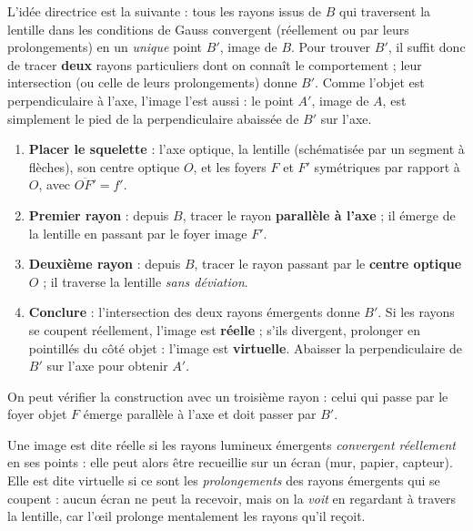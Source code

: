 \documentclass[11pt]{article}
\newcommand{\cle}[1]{{\popxbold\color{popdark}#1}}
\begin{document}
L'idée directrice est la suivante : tous les rayons issus de $B$ qui traversent la lentille dans les conditions de Gauss convergent (réellement ou par leurs prolongements) en un \emph{unique} point $B'$, image de $B$. Pour trouver $B'$, il suffit donc de tracer \textbf{deux} rayons particuliers dont on connaît le comportement ; leur intersection (ou celle de leurs prolongements) donne $B'$. Comme l'objet est perpendiculaire à l'axe, l'image l'est aussi : le point $A'$, image de $A$, est simplement le \cle{pied de la perpendiculaire} abaissée de $B'$ sur l'axe.

\begin{methode}
\begin{enumerate}
\item \textbf{Placer le squelette} : l'axe optique, la lentille (schématisée par un segment à flèches), son centre optique $O$, et les foyers $F$ et $F'$ symétriques par rapport à $O$, avec $\overline{OF'} = f'$.
\item \textbf{Premier rayon} : depuis $B$, tracer le rayon \textbf{parallèle à l'axe} ; il émerge de la lentille en passant par le foyer image $F'$.
\item \textbf{Deuxième rayon} : depuis $B$, tracer le rayon passant par le \textbf{centre optique $O$} ; il traverse la lentille \emph{sans déviation}.
\item \textbf{Conclure} : l'intersection des deux rayons émergents donne $B'$. Si les rayons se coupent réellement, l'image est \textbf{réelle} ; s'ils divergent, prolonger en pointillés du côté objet : l'image est \textbf{virtuelle}. Abaisser la perpendiculaire de $B'$ sur l'axe pour obtenir $A'$.
\end{enumerate}
On peut vérifier la construction avec un troisième rayon : celui qui passe par le foyer objet $F$ émerge parallèle à l'axe et doit passer par $B'$.
\end{methode}

\begin{propriete}
Une image est dite \cle{réelle} si les rayons lumineux émergents \emph{convergent réellement} en ses points : elle peut alors être recueillie sur un écran (mur, papier, capteur). Elle est dite \cle{virtuelle} si ce sont les \emph{prolongements} des rayons émergents qui se coupent : aucun écran ne peut la recevoir, mais on la \emph{voit} en regardant à travers la lentille, car l'œil prolonge mentalement les rayons qu'il reçoit.
\end{propriete}
\end{document}

